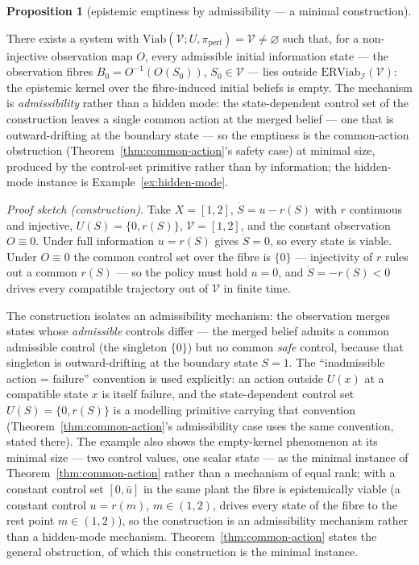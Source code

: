 \documentclass[10pt,twocolumn]{article}
\theoremstyle{definition}
\newtheorem{proposition}{Proposition}
\begin{document}
\begin{proposition}[epistemic emptiness by admissibility --- a minimal construction]\label{prop:emptiness}

There exists a system with
\(\mathrm{Viab}(\mathcal{V}; U, \pi_{\mathrm{perf}}) = \mathcal{V} \neq \varnothing\)
such that, for a non-injective observation map \(O\), every admissible
initial information state --- the observation fibres
\(B_0 = O^{-1}(O(S_0))\), \(S_0 \in \mathcal{V}\) --- lies outside
\(\mathrm{ERViab}_{\mathcal{I}}(\mathcal{V})\): the epistemic kernel
over the fibre-induced initial beliefs is empty. The mechanism is \emph{admissibility} rather than a hidden mode: the
state-dependent control set of the construction leaves a single common
action at the merged belief --- one that is outward-drifting at the
boundary state --- so the emptiness is the common-action obstruction
(Theorem~\ref{thm:common-action}'s safety case) at minimal size, produced by the control-set primitive rather than by information; the
hidden-mode instance is Example~\ref{ex:hidden-mode}.

\end{proposition}

\emph{Proof sketch (construction).} Take \(X = [1,2]\), \(\dot S = u - r(S)\) with \(r\) continuous and injective, \(U(S) = \{0, r(S)\}\), \(\mathcal{V} = [1,2]\), and the constant observation \(O \equiv 0\). Under full information \(u = r(S)\) gives \(\dot S = 0\), so every state is viable. Under \(O \equiv 0\) the common control set over the fibre is \(\{0\}\) --- injectivity of \(r\) rules out a common \(r(S)\) --- so the policy must hold \(u = 0\), and \(\dot S = -r(S) < 0\) drives every compatible trajectory out of \(\mathcal{V}\) in finite time.

The construction isolates an admissibility mechanism: the observation merges states whose \emph{admissible}
controls differ --- the merged belief admits a common admissible control
(the singleton \(\{0\}\)) but no common \emph{safe} control, because
that singleton is outward-drifting at the boundary state \(S = 1\). The
``inadmissible action = failure'' convention is used explicitly: an action outside \(U(x)\) at a compatible state \(x\) is
itself failure, and the state-dependent control set
\(U(S) = \{0, r(S)\}\) is a modelling primitive carrying that convention
(Theorem~\ref{thm:common-action}'s admissibility case uses the same convention, stated there).
The example also shows the empty-kernel phenomenon at its minimal size
--- two control values, one scalar state --- as the minimal instance of
Theorem~\ref{thm:common-action} rather than a mechanism of equal rank; with a constant control
set \([0, \bar u]\) in the same plant the fibre is epistemically viable
(a constant control \(u = r(m)\), \(m \in (1,2)\), drives every state of
the fibre to the rest point \(m \in (1,2)\)), so the construction is an admissibility mechanism rather than a hidden-mode mechanism. Theorem~\ref{thm:common-action} states the general obstruction, of which this construction is
the minimal instance.
\end{document}
